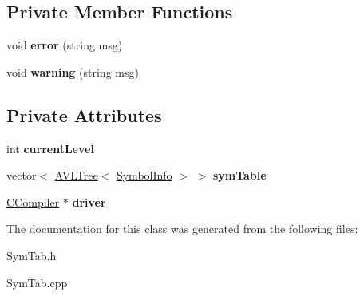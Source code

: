 \subsection*{Private Member Functions}
\begin{DoxyCompactItemize}
\item 
\hypertarget{classSymTab_aac2487968008aeee1b1e2490092c6b8b}{void {\bfseries error} (string msg)}\label{classSymTab_aac2487968008aeee1b1e2490092c6b8b}

\item 
\hypertarget{classSymTab_ae92d574f1857924058d55b69cb146af3}{void {\bfseries warning} (string msg)}\label{classSymTab_ae92d574f1857924058d55b69cb146af3}

\end{DoxyCompactItemize}
\subsection*{Private Attributes}
\begin{DoxyCompactItemize}
\item 
\hypertarget{classSymTab_a6f708ee042ccbbd40be5c4d0f6f2913c}{int {\bfseries current\-Level}}\label{classSymTab_a6f708ee042ccbbd40be5c4d0f6f2913c}

\item 
\hypertarget{classSymTab_a7316b75fd6c760f0e7db584a53ecd978}{vector$<$ \hyperlink{classAVLTree}{A\-V\-L\-Tree}$<$ \hyperlink{structSymbolInfo}{Symbol\-Info} $>$ $>$ {\bfseries sym\-Table}}\label{classSymTab_a7316b75fd6c760f0e7db584a53ecd978}

\item 
\hypertarget{classSymTab_a40af9119686052330047323628e93fdb}{\hyperlink{classCCompiler}{C\-Compiler} $\ast$ {\bfseries driver}}\label{classSymTab_a40af9119686052330047323628e93fdb}

\end{DoxyCompactItemize}


The documentation for this class was generated from the following files\-:\begin{DoxyCompactItemize}
\item 
Sym\-Tab.\-h\item 
Sym\-Tab.\-cpp\end{DoxyCompactItemize}
